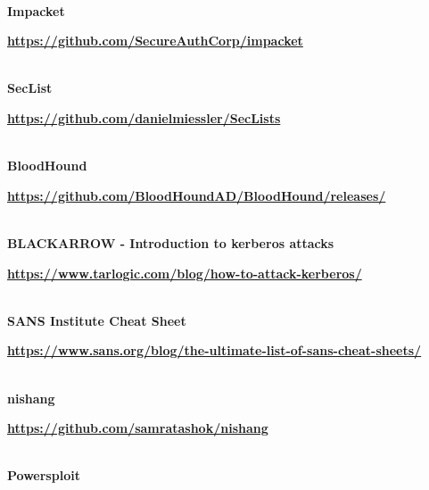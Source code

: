 \begin{adjustbox}{width=0.94\paperwidth,center}
\begin{tcolorbox}[colback=blue!5!white,colframe=blue!50!black,
  colbacktitle=blue!75!black,title=Ligazóns,fonttitle=\bfseries\color{white}]
  
\vspace*{-0.2cm} \DrawLine\\ \textbf{Impacket}

    \par 
      \href{https://github.com/SecureAuthCorp/impacket}{\textbf{\color{blue}https://github.com/SecureAuthCorp/impacket}}
    
  
\vspace*{-0.2cm} \DrawLine\\ \textbf{SecList}

    \par 
      \href{https://github.com/danielmiessler/SecLists}{\textbf{\color{blue}https://github.com/danielmiessler/SecLists}}
    
  
\vspace*{-0.2cm} \DrawLine\\ \textbf{BloodHound}

    \par 
      \href{https://github.com/BloodHoundAD/BloodHound/releases/}{\textbf{\color{blue}https://github.com/BloodHoundAD/BloodHound/releases/}}
    
  
\vspace*{-0.2cm} \DrawLine\\ \textbf{BLACKARROW - Introduction to kerberos attacks}

    \par 
      \href{https://www.tarlogic.com/blog/how-to-attack-kerberos/}{\textbf{\color{blue}https://www.tarlogic.com/blog/how-to-attack-kerberos/}}
    
  
\vspace*{-0.2cm} \DrawLine\\ \textbf{SANS Institute Cheat Sheet}

    \par 
      \href{https://www.sans.org/blog/the-ultimate-list-of-sans-cheat-sheets/}{\textbf{\color{blue}https://www.sans.org/blog/the-ultimate-list-of-sans-cheat-sheets/}}
    
  
\vspace*{-0.2cm} \DrawLine\\ \textbf{nishang}

    \par 
      \href{https://github.com/samratashok/nishang}{\textbf{\color{blue}https://github.com/samratashok/nishang}}
    
  
\vspace*{-0.2cm} \DrawLine\\ \textbf{Powersploit}


\end{tcolorbox}
\end{adjustbox}
